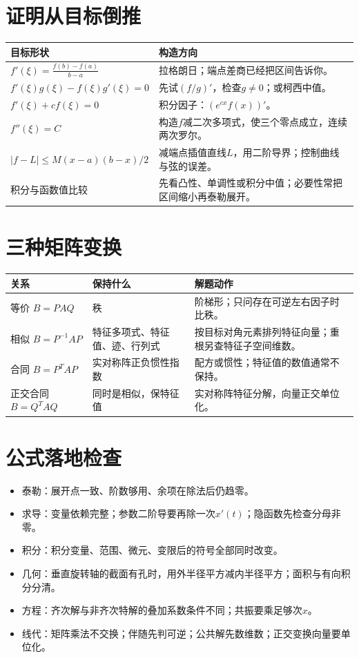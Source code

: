 \section{证明从目标倒推}
\begin{tabularx}{\textwidth}{p{39mm}Y}
\toprule 目标形状&构造方向\\\midrule
$f'(\xi)=\frac{f(b)-f(a)}{b-a}$&拉格朗日；端点差商已经把区间告诉你。\\
$f'(\xi)g(\xi)-f(\xi)g'(\xi)=0$&先试$(f/g)'$，检查$g\ne0$；或柯西中值。\\
$f'(\xi)+cf(\xi)=0$&积分因子：$(e^{cx}f(x))'$。\\
$f''(\xi)=C$&构造$f$减二次多项式，使三个零点成立，连续两次罗尔。\\
$|f-L|\le M(x-a)(b-x)/2$&减端点插值直线$L$，用二阶导界；控制曲线与弦的误差。\\
积分与函数值比较&先看凸性、单调性或积分中值；必要性常把区间缩小再泰勒展开。\\\bottomrule
\end{tabularx}

\section{三种矩阵变换}
\begin{tabularx}{\textwidth}{p{37mm}p{34mm}Y}
\toprule 关系&保持什么&解题动作\\\midrule
等价 $B=PAQ$&秩&阶梯形；只问存在可逆左右因子时比秩。\\
相似 $B=P^{-1}AP$&特征多项式、特征值、迹、行列式&按目标对角元素排列特征向量；重根另查特征子空间维数。\\
合同 $B=P^TAP$&实对称阵正负惯性指数&配方或惯性；特征值的数值通常不保持。\\
正交合同 $B=Q^TAQ$&同时是相似，保特征值&实对称阵特征分解，向量正交单位化。\\\bottomrule
\end{tabularx}

\section{公式落地检查}
\begin{itemize}
\item 泰勒：展开点一致、阶数够用、余项在除法后仍趋零。
\item 求导：变量依赖完整；参数二阶导要再除一次$x'(t)$；隐函数先检查分母非零。
\item 积分：积分变量、范围、微元、变限后的符号全部同时改变。
\item 几何：垂直旋转轴的截面有孔时，用外半径平方减内半径平方；面积与有向积分分清。
\item 方程：齐次解与非齐次特解的叠加系数条件不同；共振要乘足够次$x$。
\item 线代：矩阵乘法不交换；伴随先判可逆；公共解先数维数；正交变换向量要单位化。
\end{itemize}
